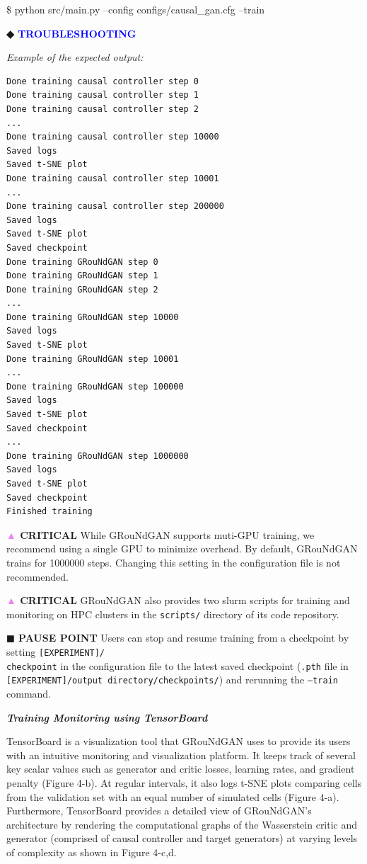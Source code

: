 \begin{tcolorbox}
\begin{codeblock}
\$ python src/main.py --config configs/causal\_gan.cfg –train
\end{codeblock}
\textbf{◆ \textcolor{blue}{TROUBLESHOOTING}}

\textit{Example of the expected output:}
\begin{codeblock}
\begin{verbatim}
Done training causal controller step 0
Done training causal controller step 1
Done training causal controller step 2
...
Done training causal controller step 10000
Saved logs
Saved t-SNE plot
Done training causal controller step 10001
...
Done training causal controller step 200000
Saved logs
Saved t-SNE plot
Saved checkpoint
Done training GRouNdGAN step 0
Done training GRouNdGAN step 1
Done training GRouNdGAN step 2
...
Done training GRouNdGAN step 10000
Saved logs
Saved t-SNE plot
Done training GRouNdGAN step 10001
...
Done training GRouNdGAN step 100000
Saved logs
Saved t-SNE plot
Saved checkpoint
...
Done training GRouNdGAN step 1000000
Saved logs
Saved t-SNE plot
Saved checkpoint
Finished training
\end{verbatim}
\end{codeblock}
\textbf{\textcolor{violet}{▲} CRITICAL} While GRouNdGAN supports muti-GPU training, we recommend using a single GPU
to minimize overhead. By default, GRouNdGAN trains for 1000000 steps. Changing this setting in
the configuration file is not recommended. 

\textbf{\textcolor{violet}{▲} CRITICAL} GRouNdGAN also provides two slurm scripts for training and monitoring on HPC
clusters in the \texttt{scripts/} directory of its code repository.

\textbf{◼ PAUSE POINT} Users can stop and resume training from a checkpoint by setting
\texttt{[EXPERIMENT]/\\checkpoint} in the configuration file to the latest saved checkpoint (\texttt{.pth} file
in \texttt{[EXPERIMENT]/output directory/checkpoints/}) and rerunning the \texttt{–train}
command. 

\textit{\textbf{Training Monitoring using TensorBoard}}

TensorBoard is a visualization tool that GRouNdGAN uses to provide its users with an intuitive
monitoring and visualization platform. It keeps track of several key scalar values such as
generator and critic losses, learning rates, and gradient penalty (Figure 4-b). At regular intervals,
it also logs t-SNE plots comparing cells from the validation set with an equal number of simulated
cells (Figure 4-a). Furthermore, TensorBoard provides a detailed view of GRouNdGAN’s
architecture by rendering the computational graphs of the Wasserstein critic and generator
(comprised of causal controller and target generators) at varying levels of complexity as shown
in Figure 4-c,d.


\end{tcolorbox}

